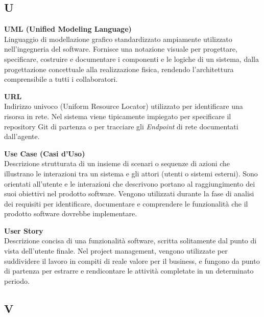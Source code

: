\documentclass[12pt, a4paper]{article}
\begin{document}
\newpage
\subsection*{U}
{}
\vspace{0.2cm}

\noindent\hypertarget{uml}{\textbf{UML (Unified Modeling Language)}} \\[0.1em]
Linguaggio di modellazione grafico standardizzato ampiamente utilizzato nell'ingegneria del software. Fornisce una notazione visuale per progettare, specificare, costruire e documentare i componenti e le logiche di un sistema, dalla progettazione concettuale alla realizzazione fisica, rendendo l'architettura comprensibile a tutti i collaboratori.
\vspace{0.5cm}

\noindent\hypertarget{url}{\textbf{URL}} \\[0.1em]
Indirizzo univoco (Uniform Resource Locator) utilizzato per identificare una risorsa in rete. Nel sistema viene tipicamente impiegato per specificare il repository Git di partenza o per tracciare gli \textit{Endpoint} di rete documentati dall'agente.
\vspace{0.5cm}  

\noindent\hypertarget{use-case}{\textbf{Use Case (Casi d'Uso)}} \\[0.1em]
Descrizione strutturata di un insieme di scenari o sequenze di azioni che illustrano le interazioni tra un sistema e gli attori (utenti o sistemi esterni). Sono orientati all'utente e le interazioni che descrivono portano al raggiungimento dei suoi obiettivi nel prodotto software. Vengono utilizzati durante la fase di analisi dei requisiti per identificare, documentare e comprendere le funzionalità che il prodotto software dovrebbe implementare.
\vspace{0.5cm}

\noindent\hypertarget{user-story}{\textbf{User Story}} \\[0.1em]
Descrizione concisa di una funzionalità software, scritta solitamente dal punto di vista dell'utente finale. Nel project management, vengono utilizzate per suddividere il lavoro in compiti di reale valore per il business, e fungono da punto di partenza per estrarre e rendicontare le attività completate in un determinato periodo.
\vspace{0.5cm}

\newpage
\subsection*{V}
{}
\vspace{0.2cm}
\end{document}
